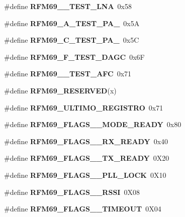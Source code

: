\begin{DoxyCompactItemize}
\mbox{\label{_r_f_m69__registri_8h_a87857b63767c7fdbcd3f8159f340544e}} 
\#define {\bfseries R\+F\+M69\+\_\+\_\+\+T\+E\+S\+T\+\_\+\+L\+NA}~0x58
\item 
\mbox{\label{_r_f_m69__registri_8h_a2d0457a0a694913f308b09ab318b1702}} 
\#define {\bfseries R\+F\+M69\+\_\+A\+\_\+\+T\+E\+S\+T\+\_\+\+P\+A\+\_}~0x5A
\item 
\mbox{\label{_r_f_m69__registri_8h_ae676ddd3d782a119d68b26e19b12e734}} 
\#define {\bfseries R\+F\+M69\+\_\+C\+\_\+\+T\+E\+S\+T\+\_\+\+P\+A\+\_}~0x5C
\item 
\mbox{\label{_r_f_m69__registri_8h_a2d066f097f8fbee89ebef1c79af1666e}} 
\#define {\bfseries R\+F\+M69\+\_\+F\+\_\+\+T\+E\+S\+T\+\_\+\+D\+A\+GC}~0x6F
\item 
\mbox{\label{_r_f_m69__registri_8h_ab98d2b3a5c8fd0d483125aba5d4f88d1}} 
\#define {\bfseries R\+F\+M69\+\_\+\_\+\+T\+E\+S\+T\+\_\+\+A\+FC}~0x71
\item 
\#define {\bfseries R\+F\+M69\+\_\+\+R\+E\+S\+E\+R\+V\+ED}(x)
\item 
\mbox{\label{_r_f_m69__registri_8h_a1e4fd91ba0f4632623d43064e9353bb2}} 
\#define {\bfseries R\+F\+M69\+\_\+\+U\+L\+T\+I\+M\+O\+\_\+\+R\+E\+G\+I\+S\+T\+RO}~0x71
\item 
\mbox{\label{_r_f_m69__registri_8h_a2618848fa50d2dc35e6bc92e2f742278}} 
\#define {\bfseries R\+F\+M69\+\_\+\+F\+L\+A\+G\+S\+\_\+\_\+\+M\+O\+D\+E\+\_\+\+R\+E\+A\+DY}~0x80
\item 
\mbox{\label{_r_f_m69__registri_8h_af72cf9972c71c315dd1bdda894310e37}} 
\#define {\bfseries R\+F\+M69\+\_\+\+F\+L\+A\+G\+S\+\_\+\_\+\+R\+X\+\_\+\+R\+E\+A\+DY}~0x40
\item 
\mbox{\label{_r_f_m69__registri_8h_a1071b53d032ccbe1edae30a85368307c}} 
\#define {\bfseries R\+F\+M69\+\_\+\+F\+L\+A\+G\+S\+\_\+\_\+\+T\+X\+\_\+\+R\+E\+A\+DY}~0\+X20
\item 
\mbox{\label{_r_f_m69__registri_8h_a0b7bc83cdfac38ca16fdec46188d7cec}} 
\#define {\bfseries R\+F\+M69\+\_\+\+F\+L\+A\+G\+S\+\_\+\_\+\+P\+L\+L\+\_\+\+L\+O\+CK}~0\+X10
\item 
\mbox{\label{_r_f_m69__registri_8h_a46b5263c7d18e30696cf6227bcb5951f}} 
\#define {\bfseries R\+F\+M69\+\_\+\+F\+L\+A\+G\+S\+\_\+\_\+\+R\+S\+SI}~0\+X08
\item 
\mbox{\label{_r_f_m69__registri_8h_a084cff8273349aba0a551d8df592f367}} 
\#define {\bfseries R\+F\+M69\+\_\+\+F\+L\+A\+G\+S\+\_\+\_\+\+T\+I\+M\+E\+O\+UT}~0\+X04
\item 
\mbox{\label{_r_f_m69__registri_8h_a9be7fda10e9fb35d7ef5eb419280b86d}} 

\end{DoxyCompactItemize}
